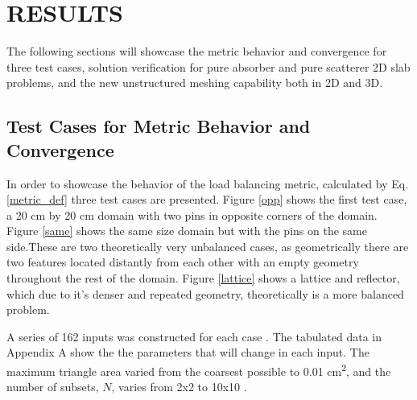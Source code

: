 
\chapter{\uppercase {Results}}
\label{ch:results}

The following sections will showcase the metric behavior and convergence for three test cases, solution verification for pure absorber and pure scatterer 2D slab problems, and the new unstructured meshing capability both in 2D and 3D.

\section{Test Cases for Metric Behavior and Convergence}
\label{sec:convergence}
In order to showcase the behavior of the load balancing metric, calculated by Eq. \ref{metric_def} three test cases are presented. Figure \ref{opp} shows the first test case, a 20 cm by 20 cm domain with two pins in opposite corners of the domain. Figure \ref{same} shows the same size domain but with the pins on the same side.These are two theoretically very unbalanced cases, as geometrically there are two features located distantly from each other with an empty geometry throughout the rest of the domain. Figure \ref{lattice} shows a lattice and reflector, which due to it's denser and repeated geometry, theoretically is a more balanced problem. 

A series of 162 inputs was constructed for each case . The tabulated data in Appendix A show the the  parameters that will change in each input. The maximum triangle area varied from the coarsest possible to 0.01 cm\textsuperscript{2}, and the number of subsets, $N$, varies from 2x2 to 10x10 . 

